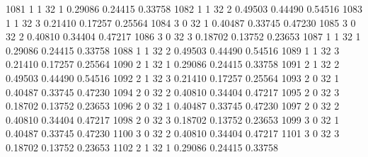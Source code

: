 \documentclass{article}
\begin{document}
\begin{Woutput}
1081      1       1      32       1       0.29086    0.24415    0.33758
1082      1       1      32       2       0.49503    0.44490    0.54516
1083      1       1      32       3       0.21410    0.17257    0.25564
1084      3       0      32       1       0.40487    0.33745    0.47230
1085      3       0      32       2       0.40810    0.34404    0.47217
1086      3       0      32       3       0.18702    0.13752    0.23653
1087      1       1      32       1       0.29086    0.24415    0.33758
1088      1       1      32       2       0.49503    0.44490    0.54516
1089      1       1      32       3       0.21410    0.17257    0.25564
1090      2       1      32       1       0.29086    0.24415    0.33758
1091      2       1      32       2       0.49503    0.44490    0.54516
1092      2       1      32       3       0.21410    0.17257    0.25564
1093      2       0      32       1       0.40487    0.33745    0.47230
1094      2       0      32       2       0.40810    0.34404    0.47217
1095      2       0      32       3       0.18702    0.13752    0.23653
1096      2       0      32       1       0.40487    0.33745    0.47230
1097      2       0      32       2       0.40810    0.34404    0.47217
1098      2       0      32       3       0.18702    0.13752    0.23653
1099      3       0      32       1       0.40487    0.33745    0.47230
1100      3       0      32       2       0.40810    0.34404    0.47217
1101      3       0      32       3       0.18702    0.13752    0.23653
1102      2       1      32       1       0.29086    0.24415    0.33758


\end{Woutput}
\end{document}
